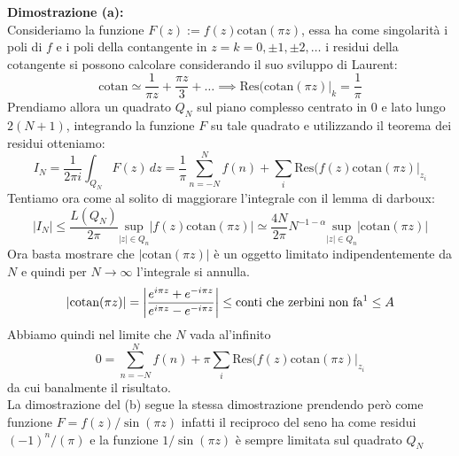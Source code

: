 \newline\textbf{Dimostrazione (a):}\\
Consideriamo la funzione $F(z):= f(z)\text{cotan}(\pi z)$, essa ha come singolarità i poli di $f$ e i poli della contangente in $z=k=0,\pm1,\pm2,\dots$ i residui della cotangente si possono calcolare considerando il suo sviluppo di Laurent:
\[\text{cotan} \simeq \frac{1}{\pi z} + \frac{\pi z}{3} + \dots \implies \text{Res}\Big(\text{cotan}(\pi z)\Big|_{k} = \frac{1}{\pi}\]
Prendiamo allora un quadrato $Q_N$ sul piano complesso centrato in 0 e lato lungo $2(N+1)$, integrando la funzione $F$ su tale quadrato e utilizzando il teorema dei residui otteniamo:
\[I_N = \frac{1}{2\pi i} \int_{Q_N} F(z)\,dz = \frac{1}{\pi}\sum_{n = -N}^N f(n) + \sum_i \text{Res}(f(z)\text{cotan}(\pi z)\Big|_{z_i} \]
Tentiamo ora come al solito di maggiorare l'integrale con il lemma di darboux:
\[|I_N|\leq \frac{L(Q_N)}{2\pi}\underset{|z|\in Q_n}{\text{sup}}|f(z)\text{cotan}(\pi z)|\simeq \frac{4N}{2\pi} N^{-1-\alpha} \underset{|z|\in Q_n}{\text{sup}}|\text{cotan}(\pi z)|\]
Ora basta mostrare che $|\text{cotan}(\pi z)|$ è un oggetto limitato indipendentemente da $N$ e quindi per $N\to \infty$ l'integrale si annulla.
\[|\text{cotan}(\pi z)| = \left|\frac{e^{i\pi z} + e^{-i\pi z}}{e^{i\pi z} -e^{-i\pi z}}\right| \leq \text{conti che zerbini non fa\footnotemark} \leq A\]
Abbiamo quindi nel limite che $N$ vada al'infinito
\[0 = \sum_{n = -N}^N f(n) + \pi \sum_i \text{Res}(f(z)\text{cotan}(\pi z)\Big|_{z_i}\]
da cui banalmente il risultato.\\
\newline La dimostrazione del (b) segue la stessa dimostrazione prendendo però come funzione $F=f(z)/\sin(\pi z)$ infatti il reciproco del seno ha come residui $(-1)^n/(\pi)$ e la funzione $1/\sin(\pi z)$ è sempre limitata sul quadrato $Q_N$
